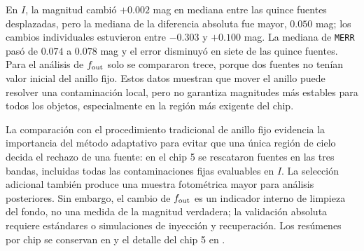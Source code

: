 \documentclass[12pt,letterpaper,oneside]{book}
\begin{document}
En $I$, la magnitud cambió $+0.002$ mag en mediana entre las quince fuentes desplazadas, pero la mediana de la diferencia absoluta fue mayor, $0.050$ mag; los cambios individuales estuvieron entre $-0.303$ y $+0.100$ mag. La mediana de \texttt{MERR} pasó de $0.074$ a $0.078$ mag y el error disminuyó en siete de las quince fuentes. Para el análisis de $f_{\rm out}$ solo se compararon trece, porque dos fuentes no tenían valor inicial del anillo fijo. Estos datos muestran que mover el anillo puede resolver una contaminación local, pero no garantiza magnitudes más estables para todos los objetos, especialmente en la región más exigente del chip.

\begin{table}[H]
\centering
{}
\caption{Cambios fotométricos en las fuentes desplazadas del chip 5. $N_{\rm movidas}$ cuenta comparaciones con magnitud y error válidos; para $I$, los valores de $f_{\rm out}$ usan las trece fuentes con anillo fijo evaluable.}
\label{tab:sextans-chip5-comparacion-bvi}
\end{table}

La comparación con el procedimiento tradicional de anillo fijo evidencia la importancia del método adaptativo para evitar que una única región de cielo decida el rechazo de una fuente: en el chip 5 se rescataron fuentes en las tres bandas, incluidas todas las contaminaciones fijas evaluables en $I$. La selección adicional también produce una muestra fotométrica mayor para análisis posteriores. Sin embargo, el cambio de $f_{\rm out}$ es un indicador interno de limpieza del fondo, no una medida de la magnitud verdadera; la validación absoluta requiere estándares o simulaciones de inyección y recuperación. Los resúmenes por chip se conservan en  y el detalle del chip 5 en .
\end{document}
